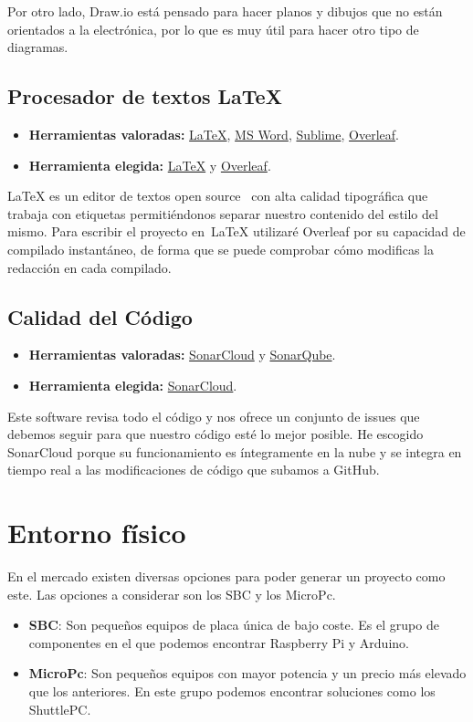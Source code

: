 Por otro lado, Draw.io está pensado para hacer planos y dibujos que no están orientados a la electrónica, por lo que es muy útil para hacer otro tipo de diagramas.

\subsection{Procesador de textos \LaTeX}\label{4:latex}
\begin{itemize}
    \item \textbf{Herramientas valoradas:} \href{https://www.latex-project.org/}{\LaTeX}, \href{https://www.microsoft.com/es-es/microsoft-365/word}{MS Word}, \href{https://www.sublimetext.com/}{Sublime}, \href{https://www.overleaf.com/}{Overleaf}.
    \item \textbf{Herramienta elegida:} \href{https://www.latex-project.org/}{\LaTeX} y \href{https://www.overleaf.com/}{Overleaf}.
\end{itemize}
\LaTeX{} es un editor de textos open source~\cite{misc:OpenSource} con alta calidad tipográfica que trabaja con etiquetas permitiéndonos separar nuestro contenido del estilo del mismo. Para escribir el proyecto en~\LaTeX{} utilizaré Overleaf por su capacidad de compilado instantáneo, de forma que se puede comprobar cómo modificas la redacción en cada compilado.

\subsection{Calidad del Código}
\begin{itemize}
    \item \textbf{Herramientas valoradas:} \href{https://sonarcloud.io/}{SonarCloud} y \href{https://www.sonarqube.org/}{SonarQube}.
    \item \textbf{Herramienta elegida:} \href{https://sonarcloud.io/}{SonarCloud}.
\end{itemize}
Este software revisa todo el código y nos ofrece un conjunto de issues que debemos seguir para que nuestro código esté lo mejor posible. He escogido SonarCloud porque su funcionamiento es íntegramente en la nube y se integra en tiempo real a las modificaciones de código que subamos a GitHub.

\section{Entorno físico}

En el mercado existen diversas opciones para poder generar un proyecto como este. Las opciones a considerar son los SBC y los MicroPc.
\begin{itemize}
    \item \textbf{SBC}: Son pequeños equipos de placa única de bajo coste. Es el grupo de componentes en el que podemos encontrar Raspberry Pi y Arduino.
    \item \textbf{MicroPc}: Son pequeños equipos con mayor potencia y un precio más elevado que los anteriores. En este grupo podemos encontrar soluciones como los ShuttlePC.
\end{itemize}


